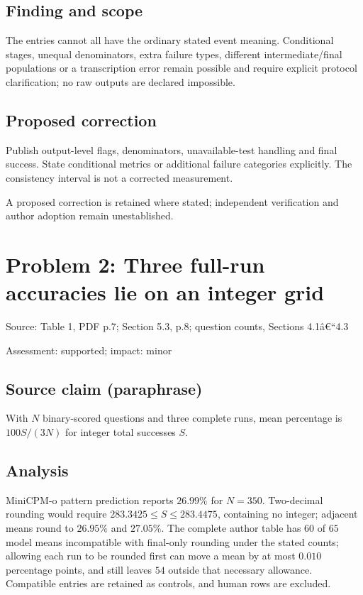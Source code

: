 \documentclass[11pt]{article}
\begin{document}
\subsection*{Finding and scope}

The entries cannot all have the ordinary stated event meaning. Conditional stages, unequal denominators, extra failure types, different intermediate/final populations or a transcription error remain possible and require explicit protocol clarification; no raw outputs are declared impossible.

\subsection*{Proposed correction}

Publish output-level flags, denominators, unavailable-test handling and final success. State conditional metrics or additional failure categories explicitly. The consistency interval is not a corrected measurement.

A proposed correction is retained where stated; independent verification and author adoption remain unestablished.

\section*{Problem 2: Three full-run accuracies lie on an integer grid}

Source: Table 1, PDF p.7; Section 5.3, p.8; question counts, Sections 4.1â€“4.3

Assessment: supported; impact: minor

\subsection*{Source claim (paraphrase)}

With \(N\) binary-scored questions and three complete runs, mean percentage is \(100S/(3N)\) for integer total successes \(S\).

\subsection*{Analysis}

MiniCPM-o pattern prediction reports \(26.99\%\) for \(N=350\). Two-decimal rounding would require \(283.3425\le S\le283.4475\), containing no integer; adjacent means round to \(26.95\%\) and \(27.05\%\). The complete author table has \(60\) of \(65\) model means incompatible with final-only rounding under the stated counts; allowing each run to be rounded first can move a mean by at most \(0.010\) percentage points, and still leaves \(54\) outside that necessary allowance. Compatible entries are retained as controls, and human rows are excluded.
\end{document}
